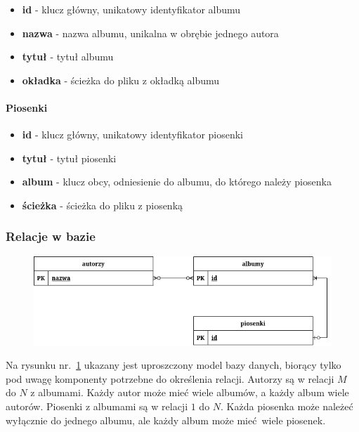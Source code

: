 \begin{itemize}
	\item \textbf{id} - klucz główny, unikatowy identyfikator albumu
	
	\item \textbf{nazwa} - nazwa albumu, unikalna w obrębie jednego autora
	
	\item \textbf{tytuł} - tytuł albumu

	\item \textbf{okładka} - ścieżka do pliku z okładką albumu
\end{itemize}

\paragraph{Piosenki}

\begin{itemize}
	\item \textbf{id} - klucz główny, unikatowy identyfikator piosenki
	
	\item \textbf{tytuł} - tytuł piosenki
	
	\item \textbf{album} - klucz obcy, odniesienie do albumu, do którego należy piosenka
	
	\item \textbf{ścieżka} - ścieżka do pliku z piosenką
\end{itemize}

\subsubsection{Relacje w bazie} \label{sec:dbrelations}

\begin{figure}[H]
	\centering
	\includegraphics[width=1\textwidth]{images/ch3-db-relacje.drawio.png}
	\caption{}
	\label{fig:dbrelations}
\end{figure}

Na rysunku nr.~\ref{fig:dbrelations} ukazany jest uproszczony model bazy danych, biorący tylko pod uwagę komponenty potrzebne do określenia relacji. Autorzy są w relacji $M$ do $N$ z albumami. Każdy autor może mieć wiele albumów, a każdy album wiele autorów. Piosenki z albumami są w relacji $1$ do $N$. Każda piosenka może należeć wyłącznie do jednego albumu, ale każdy album może mieć wiele piosenek.

